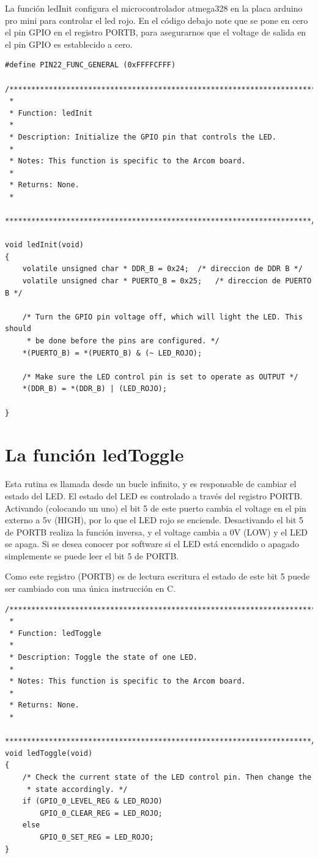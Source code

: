 \documentclass[12pt]{article}
\begin{document}
La función ledInit configura el microcontrolador atmega328 en la placa
arduino pro mini para controlar el led rojo.
En el código debajo note que se pone en cero el pin GPIO en el registro
PORTB, para asegurarnos que el voltage de salida en el pin GPIO es 
establecido a cero.


\begin{verbatim}
#define PIN22_FUNC_GENERAL (0xFFFFCFFF)

/**********************************************************************
 *
 * Function: ledInit
 *
 * Description: Initialize the GPIO pin that controls the LED.
 *
 * Notes: This function is specific to the Arcom board.
 *
 * Returns: None.
 *
 **********************************************************************/

void ledInit(void)
{
    volatile unsigned char * DDR_B = 0x24;	/* direccion de DDR B */
    volatile unsigned char * PUERTO_B = 0x25;	/* direccion de PUERTO B */

    /* Turn the GPIO pin voltage off, which will light the LED. This should
     * be done before the pins are configured. */
    *(PUERTO_B) = *(PUERTO_B) & (~ LED_ROJO);

    /* Make sure the LED control pin is set to operate as OUTPUT */
    *(DDR_B) = *(DDR_B) | (LED_ROJO);

}
\end{verbatim}


\section *{La función ledToggle}

Esta rutina es llamada desde un bucle infinito, y es responsable de cambiar
el estado del LED. El estado del LED es controlado a través del registro
PORTB. Activando (colocando un uno) el bit 5 de este puerto cambia el voltage 
en el pin externo a 5v (HIGH), por lo que el LED rojo se enciende.
Desactivando el bit 5 de PORTB realiza la función inversa, y el voltage cambia
a 0V (LOW) y el LED se apaga.
Si se desea conocer por software si el LED está encendido o apagado simplemente
se puede leer el bit 5 de PORTB.

Como este registro (PORTB) es de lectura escritura el estado de este bit
5 puede ser cambiado con una única instrucción en C.

\begin{verbatim}
/**********************************************************************
 *
 * Function: ledToggle
 *
 * Description: Toggle the state of one LED.
 *
 * Notes: This function is specific to the Arcom board.
 *
 * Returns: None.
 *
 **********************************************************************/
void ledToggle(void)
{
    /* Check the current state of the LED control pin. Then change the
     * state accordingly. */
    if (GPIO_0_LEVEL_REG & LED_ROJO)
        GPIO_0_CLEAR_REG = LED_ROJO;
    else
        GPIO_0_SET_REG = LED_ROJO;
}
\end{verbatim}
\end{document}
